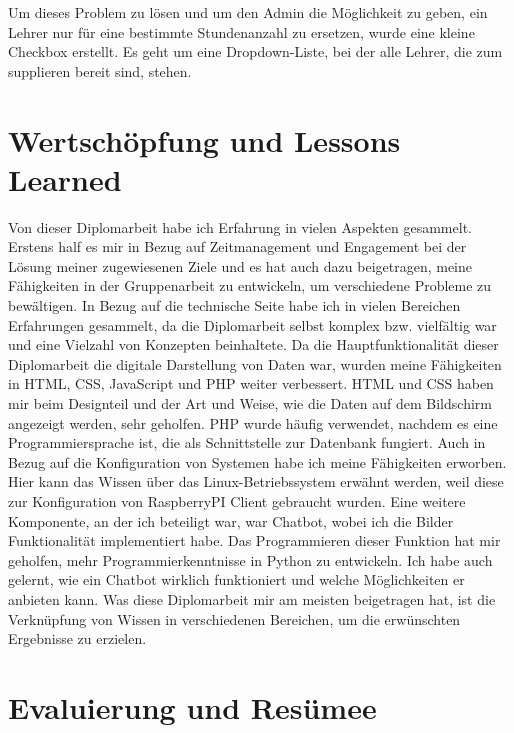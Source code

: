 Um dieses Problem zu lösen und um den Admin die Möglichkeit zu geben, ein Lehrer nur für eine bestimmte Stundenanzahl zu ersetzen, wurde eine kleine Checkbox erstellt. Es geht um eine Dropdown-Liste, bei der alle Lehrer, die zum supplieren bereit sind, stehen. 

\section{Wertschöpfung und Lessons Learned}


Von dieser Diplomarbeit habe ich Erfahrung in vielen Aspekten gesammelt. Erstens half es mir in Bezug auf Zeitmanagement und Engagement bei der Lösung meiner zugewiesenen Ziele und es hat auch dazu beigetragen, meine Fähigkeiten in der Gruppenarbeit zu entwickeln, um verschiedene Probleme zu bewältigen. In Bezug auf die technische Seite habe ich in vielen Bereichen Erfahrungen gesammelt, da die Diplomarbeit selbst komplex bzw. vielfältig war und eine Vielzahl von Konzepten beinhaltete. Da die Hauptfunktionalität dieser Diplomarbeit die digitale Darstellung von Daten war, wurden meine Fähigkeiten in HTML, CSS, JavaScript und PHP weiter verbessert. HTML und CSS haben mir beim Designteil und der Art und Weise, wie die Daten auf dem Bildschirm angezeigt werden, sehr geholfen. PHP wurde häufig verwendet, nachdem es eine Programmiersprache ist, die als Schnittstelle zur Datenbank fungiert. Auch in Bezug auf die Konfiguration von Systemen habe ich meine Fähigkeiten erworben. Hier kann das Wissen über das Linux-Betriebssystem erwähnt werden, weil diese zur Konfiguration von RaspberryPI Client gebraucht wurden. Eine weitere Komponente, an der ich beteiligt war, war Chatbot, wobei ich die Bilder Funktionalität implementiert habe. Das Programmieren dieser Funktion hat mir geholfen, mehr Programmierkenntnisse in Python zu entwickeln. Ich habe auch gelernt, wie ein Chatbot wirklich funktioniert und welche Möglichkeiten er anbieten kann. Was diese Diplomarbeit mir am meisten beigetragen hat, ist die Verknüpfung von Wissen in verschiedenen Bereichen, um die erwünschten Ergebnisse zu erzielen.

\section{Evaluierung und Resümee}

